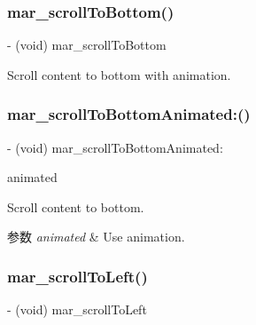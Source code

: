 \subsubsection{\texorpdfstring{mar\+\_\+scroll\+To\+Bottom()}{mar\_scrollToBottom()}}
{\footnotesize\ttfamily -\/ (void) mar\+\_\+scroll\+To\+Bottom \begin{DoxyParamCaption}{ }\end{DoxyParamCaption}}

Scroll content to bottom with animation. \mbox{\label{category_u_i_scroll_view_07_m_a_r_e_x_08_a8ebb0387f4964681b9293590a2f7a1ad}} 
\subsubsection{\texorpdfstring{mar\+\_\+scroll\+To\+Bottom\+Animated\+:()}{mar\_scrollToBottomAnimated:()}}
{\footnotesize\ttfamily -\/ (void) mar\+\_\+scroll\+To\+Bottom\+Animated\+: \begin{DoxyParamCaption}\item[{(B\+O\+OL)}]{animated }\end{DoxyParamCaption}}

Scroll content to bottom.


\begin{DoxyParams}{参数}
{\em animated} & Use animation. \\
\hline
\end{DoxyParams}
\mbox{\label{category_u_i_scroll_view_07_m_a_r_e_x_08_ae4bedf884899a044392bf3091d3d7302}} 
\subsubsection{\texorpdfstring{mar\+\_\+scroll\+To\+Left()}{mar\_scrollToLeft()}}
{\footnotesize\ttfamily -\/ (void) mar\+\_\+scroll\+To\+Left \begin{DoxyParamCaption}{ }\end{DoxyParamCaption}}

